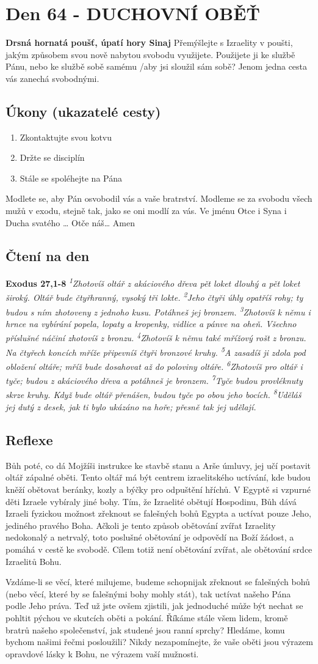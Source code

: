 \documentclass[11pt]{article}
\newcommand{\zacatekDesatyTyden}{
\textbf{Drsná hornatá poušť, úpatí hory Sinaj} \newline 
Přemýšlejte s Izraelity v poušti, jakým způsobem svou nově nabytou svobodu využijete. Použijete ji ke službě Pánu, nebo ke službě sobě samému /aby jsi sloužil sám sobě? Jenom jedna cesta vás zanechá svobodnými.

\subsection*{Úkony (ukazatelé cesty)}
\begin{enumerate}
  \item Zkontaktujte svou kotvu
  \item Držte se disciplín
  \item Stále se spoléhejte na Pána
\end{enumerate}
Modlete se, aby Pán osvobodil vás a vaše bratrství. \newline
Modleme se za svobodu všech mužů v exodu, stejně tak, jako se oni modlí za vás.\newline
Ve jménu Otce i Syna i Ducha svatého …  Otče náš… Amen
}
\begin{document}
\newpage
\section{Den 64 - DUCHOVNÍ OBĚŤ}
\zacatekDesatyTyden
\subsection*{Čtení na den}
\textbf{Exodus 27,1-8}
\newline
\textit{
\textsuperscript{1}Zhotovíš oltář z akáciového dřeva pět loket dlouhý a pět loket široký. Oltář bude čtyřhranný, vysoký tři lokte.
\textsuperscript{2}Jeho čtyři úhly opatříš rohy; ty budou s ním zhotoveny z jednoho kusu. Potáhneš jej bronzem.
\textsuperscript{3}Zhotovíš k němu i hrnce na vybírání popela, lopaty a kropenky, vidlice a pánve na oheň. Všechno příslušné náčiní zhotovíš z bronzu.
\textsuperscript{4}Zhotovíš k němu také mřížový rošt z bronzu. Na čtyřech koncích mříže připevníš čtyři bronzové kruhy.
\textsuperscript{5}A zasadíš ji zdola pod obložení oltáře; mříž bude dosahovat až do poloviny oltáře.
\textsuperscript{6}Zhotovíš pro oltář i tyče; budou z akáciového dřeva a potáhneš je bronzem.
\textsuperscript{7}Tyče budou provléknuty skrze kruhy. Když bude oltář přenášen, budou tyče po obou jeho bocích.
\textsuperscript{8}Uděláš jej dutý z desek, jak ti bylo ukázáno na hoře; přesně tak jej udělají.
}

\subsection*{Reflexe}
Bůh poté, co dá Mojžíši instrukce ke stavbě stanu a Arše úmluvy, jej učí postavit oltář zápalné oběti. Tento
oltář má být centrem izraelitského uctívání, kde budou kněží obětovat beránky, kozly a býčky pro odpuštění
hříchů. V Egyptě si vzpurné děti Izraele vybíraly jiné bohy. Tím, že Izraelité obětují Hospodinu, Bůh dává
Izraeli fyzickou možnost zřeknout se falešných bohů Egypta a uctívat pouze Jeho, jediného pravého Boha.
Ačkoli je tento způsob obětování zvířat Izraelity nedokonalý a netrvalý, toto poslušné obětování je odpovědí
na Boží žádost, a pomáhá v cestě ke svobodě. Cílem totiž není obětování zvířat, ale obětování srdce Izraelitů
Bohu.

Vzdáme-li se věcí, které milujeme, budeme schopnijak zřeknout se falešných bohů (nebo věcí, které by se
falešnými bohy mohly stát), tak uctívat našeho Pána podle Jeho práva. Teď už jste ovšem zjistili, jak
jednoduché může být nechat se pohltit pýchou ve skutcích oběti a pokání. Říkáme stále všem lidem, kromě
bratrů našeho společenství, jak studené jsou ranní sprchy? Hledáme, komu bychom našimi řečmi posloužili?
Nikdy nezapomínejte, že vaše oběti jsou výrazem opravdové lásky k Bohu, ne výrazem vaší mužnosti.
\end{document}

